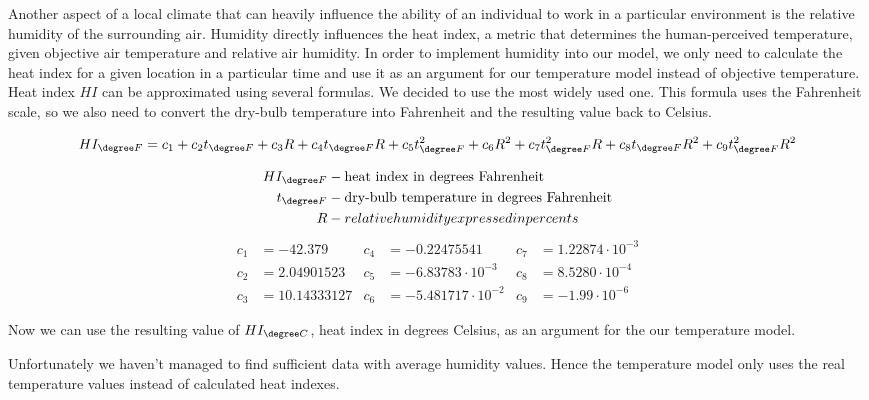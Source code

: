 Another aspect of a local climate that can heavily influence the ability of an individual to work in a particular environment is the relative humidity of the surrounding air. Humidity directly influences the heat index, a metric that determines the human-perceived temperature, given objective air temperature and relative air humidity. In order to implement humidity into our model, we only need to calculate the heat index for a given location in a particular time and use it as an argument for our temperature model instead of objective temperature. Heat index $HI$ can be approximated using several formulas. We decided to use the most widely used one. This formula uses the Fahrenheit scale, so we also need to convert the dry-bulb temperature into Fahrenheit and the resulting value back to Celsius.

$$HI_{\degree F}= c_1+c_{2}t_{\degree F}+c_{3}R+c_{4}t_{\degree F}R+c_{5}t_{\degree F}^2+c_{6}R^2+c_{7}t_{\degree F}^{2}R+c_{8}t_{\degree F}R^2+c_{9}t_{\degree F}^{2}R^2$$



\begin{align*}
HI_{\degree F} &- \text{heat index in degrees Fahrenheit}\\
t_{\degree F} &- \text{dry-bulb temperature in degrees Fahrenheit}\\
R &- relative humidity expressed in percents
\end{align*}
\begin{align*}
c_1 &= -42.379 & c_4 &= -0.22475541 & c_7 &= 1.22874 \cdot 10^{-3}\\
c_2 &= 2.04901523 & c_5 &= -6.83783 \cdot 10^{-3} & c_8 &= 8.5280 \cdot 10^{-4}\\
c_3 &= 10.14333127 & c_6 &= -5.481717 \cdot 10^{-2} & c_9 &= -1.99 \cdot 10^{-6}
\end{align*}

Now we can use the resulting value of $HI_{\degree C}$, heat index in degrees Celsius, as an argument for the our temperature model.

Unfortunately we haven't managed to find sufficient data with average humidity values. Hence the temperature model only uses the real temperature values instead of calculated heat indexes.
